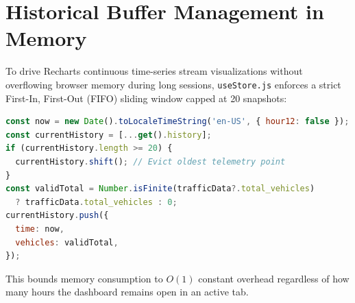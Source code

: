 \section{Historical Buffer Management in Memory}
To drive Recharts continuous time-series stream visualizations without overflowing browser memory during long sessions, \texttt{useStore.js} enforces a strict First-In, First-Out (FIFO) sliding window capped at 20 snapshots:
\begin{lstlisting}[language=JavaScript]
const now = new Date().toLocaleTimeString('en-US', { hour12: false });
const currentHistory = [...get().history];
if (currentHistory.length >= 20) {
  currentHistory.shift(); // Evict oldest telemetry point
}
const validTotal = Number.isFinite(trafficData?.total_vehicles)
  ? trafficData.total_vehicles : 0;
currentHistory.push({
  time: now,
  vehicles: validTotal,
});
\end{lstlisting}
This bounds memory consumption to $O(1)$ constant overhead regardless of how many hours the dashboard remains open in an active tab.
